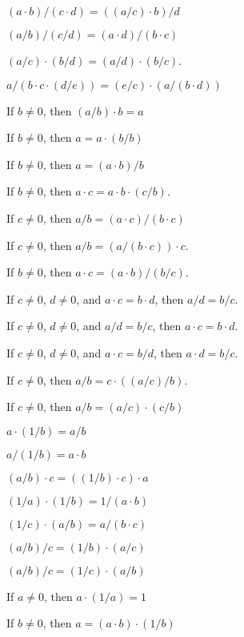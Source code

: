 \documentclass{article}
\begin{document}
\begin{thm}
\item\label{xcmplx1:83} $(a\cdot b)/(c\cdot d)=((a/c)\cdot b)/d$
  \bigbreak
\item\label{xcmplx1:84} $(a/b)/(c/d)=(a\cdot d)/(b\cdot c)$
\item\label{xcmplx1:85} $(a/c)\cdot(b/d)=(a/d)\cdot(b/c)$.
\item\label{xcmplx1:86} $a/(b\cdot c\cdot (d/e))=(e/c)\cdot(a/(b\cdot d))$
  \bigbreak
\item\label{xcmplx1:87} If $b\neq0$, then $(a/b)\cdot b=a$
\item\label{xcmplx1:88} If $b\neq0$, then $a=a\cdot(b/b)$
\item\label{xcmplx1:89} If $b\neq0$, then $a=(a\cdot b)/b$
\item\label{xcmplx1:90} If $b\neq 0$, then $a\cdot c=a\cdot b\cdot(c/b)$.
  \bigbreak
\item\label{xcmplx1:91} If $c\neq0$, then $a/b=(a\cdot c)/(b\cdot c)$
\item\label{xcmplx1:92} If $c\neq0$, then $a/b=(a/(b\cdot c))\cdot c$.
\item\label{xcmplx1:93} If $b\neq0$, then $a\cdot c=(a\cdot b)/(b/c)$.
\item\label{xcmplx1:94} If $c\neq 0$, $d\neq 0$, and $a\cdot c=b\cdot d$,
  then $a/d=b/c$.
\item\label{xcmplx1:95} If $c\neq0$, $d\neq0$, and $a/d=b/c$, then
  $a\cdot c=b\cdot d$.
\item\label{xcmplx1:96} If $c\neq0$, $d\neq0$, and $a\cdot c=b/d$,
  then $a\cdot d=b/c$.
  \bigbreak
\item\label{xcmplx1:97} If $c\neq0$, then $a/b=c\cdot((a/c)/b)$.
\item\label{xcmplx1:98} If $c\neq0$, then $a/b=(a/c)\cdot(c/b)$
  \bigbreak
\item\label{xcmplx1:99} $a\cdot(1/b)=a/b$
\item\label{xcmplx1:100} $a/(1/b)=a\cdot b$
\item\label{xcmplx1:101} $(a/b)\cdot c=((1/b)\cdot c)\cdot a$
  \bigbreak
\item\label{xcmplx1:102} $(1/a)\cdot(1/b)=1/(a\cdot b)$
\item\label{xcmplx1:103} $(1/c)\cdot(a/b)=a/(b\cdot c)$
  \bigbreak
\item\label{xcmplx1:104} $(a/b)/c=(1/b)\cdot(a/c)$
\item\label{xcmplx1:105} $(a/b)/c=(1/c)\cdot(a/b)$
  \bigbreak
\item\label{xcmplx1:106} If $a\neq0$, then $a\cdot(1/a)=1$
\item\label{xcmplx1:107} If $b\neq0$, then $a=(a\cdot b)\cdot(1/b)$

\end{thm}
\end{document}
